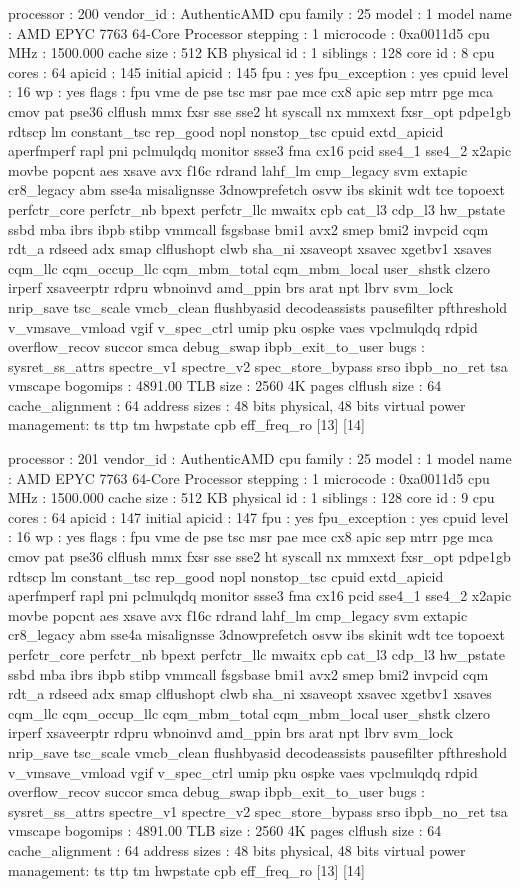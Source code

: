 processor	: 200
vendor_id	: AuthenticAMD
cpu family	: 25
model		: 1
model name	: AMD EPYC 7763 64-Core Processor
stepping	: 1
microcode	: 0xa0011d5
cpu MHz		: 1500.000
cache size	: 512 KB
physical id	: 1
siblings	: 128
core id		: 8
cpu cores	: 64
apicid		: 145
initial apicid	: 145
fpu		: yes
fpu_exception	: yes
cpuid level	: 16
wp		: yes
flags		: fpu vme de pse tsc msr pae mce cx8 apic sep mtrr pge mca cmov pat pse36 clflush mmx fxsr sse sse2 ht syscall nx mmxext fxsr_opt pdpe1gb rdtscp lm constant_tsc rep_good nopl nonstop_tsc cpuid extd_apicid aperfmperf rapl pni pclmulqdq monitor ssse3 fma cx16 pcid sse4_1 sse4_2 x2apic movbe popcnt aes xsave avx f16c rdrand lahf_lm cmp_legacy svm extapic cr8_legacy abm sse4a misalignsse 3dnowprefetch osvw ibs skinit wdt tce topoext perfctr_core perfctr_nb bpext perfctr_llc mwaitx cpb cat_l3 cdp_l3 hw_pstate ssbd mba ibrs ibpb stibp vmmcall fsgsbase bmi1 avx2 smep bmi2 invpcid cqm rdt_a rdseed adx smap clflushopt clwb sha_ni xsaveopt xsavec xgetbv1 xsaves cqm_llc cqm_occup_llc cqm_mbm_total cqm_mbm_local user_shstk clzero irperf xsaveerptr rdpru wbnoinvd amd_ppin brs arat npt lbrv svm_lock nrip_save tsc_scale vmcb_clean flushbyasid decodeassists pausefilter pfthreshold v_vmsave_vmload vgif v_spec_ctrl umip pku ospke vaes vpclmulqdq rdpid overflow_recov succor smca debug_swap ibpb_exit_to_user
bugs		: sysret_ss_attrs spectre_v1 spectre_v2 spec_store_bypass srso ibpb_no_ret tsa vmscape
bogomips	: 4891.00
TLB size	: 2560 4K pages
clflush size	: 64
cache_alignment	: 64
address sizes	: 48 bits physical, 48 bits virtual
power management: ts ttp tm hwpstate cpb eff_freq_ro [13] [14]

processor	: 201
vendor_id	: AuthenticAMD
cpu family	: 25
model		: 1
model name	: AMD EPYC 7763 64-Core Processor
stepping	: 1
microcode	: 0xa0011d5
cpu MHz		: 1500.000
cache size	: 512 KB
physical id	: 1
siblings	: 128
core id		: 9
cpu cores	: 64
apicid		: 147
initial apicid	: 147
fpu		: yes
fpu_exception	: yes
cpuid level	: 16
wp		: yes
flags		: fpu vme de pse tsc msr pae mce cx8 apic sep mtrr pge mca cmov pat pse36 clflush mmx fxsr sse sse2 ht syscall nx mmxext fxsr_opt pdpe1gb rdtscp lm constant_tsc rep_good nopl nonstop_tsc cpuid extd_apicid aperfmperf rapl pni pclmulqdq monitor ssse3 fma cx16 pcid sse4_1 sse4_2 x2apic movbe popcnt aes xsave avx f16c rdrand lahf_lm cmp_legacy svm extapic cr8_legacy abm sse4a misalignsse 3dnowprefetch osvw ibs skinit wdt tce topoext perfctr_core perfctr_nb bpext perfctr_llc mwaitx cpb cat_l3 cdp_l3 hw_pstate ssbd mba ibrs ibpb stibp vmmcall fsgsbase bmi1 avx2 smep bmi2 invpcid cqm rdt_a rdseed adx smap clflushopt clwb sha_ni xsaveopt xsavec xgetbv1 xsaves cqm_llc cqm_occup_llc cqm_mbm_total cqm_mbm_local user_shstk clzero irperf xsaveerptr rdpru wbnoinvd amd_ppin brs arat npt lbrv svm_lock nrip_save tsc_scale vmcb_clean flushbyasid decodeassists pausefilter pfthreshold v_vmsave_vmload vgif v_spec_ctrl umip pku ospke vaes vpclmulqdq rdpid overflow_recov succor smca debug_swap ibpb_exit_to_user
bugs		: sysret_ss_attrs spectre_v1 spectre_v2 spec_store_bypass srso ibpb_no_ret tsa vmscape
bogomips	: 4891.00
TLB size	: 2560 4K pages
clflush size	: 64
cache_alignment	: 64
address sizes	: 48 bits physical, 48 bits virtual
power management: ts ttp tm hwpstate cpb eff_freq_ro [13] [14]

